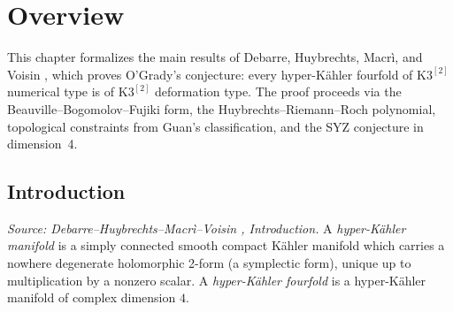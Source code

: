 \chapter{Overview}
\label{chap:overview}


This chapter formalizes the main results of Debarre, Huybrechts, Macr\`i, and Voisin
\cite{MR4654610}, which proves O'Grady's conjecture: every hyper-K\"ahler fourfold of
\(\mathrm{K3}^{[2]}\) numerical type is of \(\mathrm{K3}^{[2]}\) deformation type.
The proof proceeds via the Beauville--Bogomolov--Fujiki form, the
Huybrechts--Riemann--Roch polynomial, topological constraints from Guan's classification,
and the SYZ conjecture in dimension~4.

\section{Introduction}

\begin{definition}
  \label{def:hyp-kahler-fourfold}
  \textit{Source: Debarre--Huybrechts--Macr\`i--Voisin \cite{MR4654610}, Introduction.}
  A \emph{hyper-K\"ahler manifold} is a simply connected smooth compact K\"ahler manifold
  which carries a nowhere degenerate holomorphic 2-form (a symplectic form), unique up to
  multiplication by a nonzero scalar.  A \emph{hyper-K\"ahler fourfold} is a hyper-K\"ahler
  manifold of complex dimension \(4\).
\end{definition}

